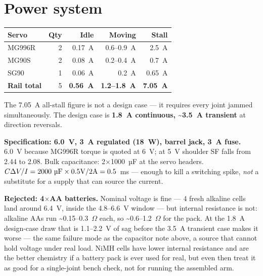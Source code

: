 \documentclass[11pt]{article}
\newcommand{\micro}{\ifmmode\text{µ}\else µ\fi}
\begin{document}
\section{Power system}
\label{sec:power}

\begin{center}
\begin{tabular}{lrrrr}
\toprule
\textbf{Servo} & \textbf{Qty} & \textbf{Idle} & \textbf{Moving} & \textbf{Stall} \\
\midrule
MG996R & 2 & 0.17~A & 0.6--0.9~A & 2.5~A \\
MG90S & 2 & 0.08~A & 0.2--0.4~A & 0.7~A \\
SG90 & 1 & 0.06~A & 0.2~A & 0.65~A \\
\midrule
\textbf{Rail total} & 5 & \textbf{0.56~A} & \textbf{1.2--1.8~A} & \textbf{7.05~A} \\
\bottomrule
\end{tabular}
\end{center}

The 7.05~A all-stall figure is not a design case --- it requires every joint jammed simultaneously. The design case is \textbf{1.8~A continuous, \textasciitilde3.5~A transient} at direction reversals.

\textbf{Specification: 6.0~V, 3~A regulated (18~W), barrel jack, 3~A fuse.} 6.0~V because MG996R torque is quoted at 6~V; at 5~V shoulder SF falls from 2.44 to 2.08. Bulk capacitance: 2$\times$1000~\micro F at the servo headers. $C\Delta V/I = 2000~\micro\text{F}\times0.5\text{V}/2\text{A} = 0.5$~ms --- enough to kill a switching spike, \emph{not} a substitute for a supply that can source the current.

\textbf{Rejected: 4$\times$AA batteries.} Nominal voltage is fine --- 4 fresh alkaline cells land around 6.4~V, inside the 4.8--6.6~V window --- but internal resistance is not: alkaline AAs run \textasciitilde0.15--0.3~$\Omega$ each, so \textasciitilde0.6--1.2~$\Omega$ for the pack. At the 1.8~A design-case draw that is 1.1--2.2~V of sag before the 3.5~A transient case makes it worse --- the same failure mode as the capacitor note above, a source that cannot hold voltage under real load. NiMH cells have lower internal resistance and are the better chemistry if a battery pack is ever used for real, but even then treat it as good for a single-joint bench check, not for running the assembled arm.
\end{document}
